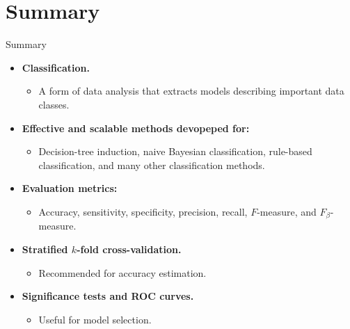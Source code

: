 \section{Summary}

\begin{frame}{Summary}
	\begin{itemize}
		\item \textbf{Classification.}
		      \begin{itemize}
			      \item A form of data analysis that extracts models describing important data classes.
		      \end{itemize}
		\item \textbf{Effective and scalable methods devopeped for:}
		      \begin{itemize}
			      \item Decision-tree induction, naive Bayesian classification, rule-based classification, and many other classification methods.
		      \end{itemize}
		\item \textbf{Evaluation metrics:}
		      \begin{itemize}
			      \item Accuracy, sensitivity, specificity, precision, recall, $F$-measure, and $F_\beta$-measure.
		      \end{itemize}
		\item \textbf{Stratified $k$-fold cross-validation.}
		      \begin{itemize}
			      \item Recommended for accuracy estimation.
		      \end{itemize}
		\item \textbf{Significance tests and ROC curves.}
		      \begin{itemize}
			      \item Useful for model selection.
		      \end{itemize}
	\end{itemize}
\end{frame}
